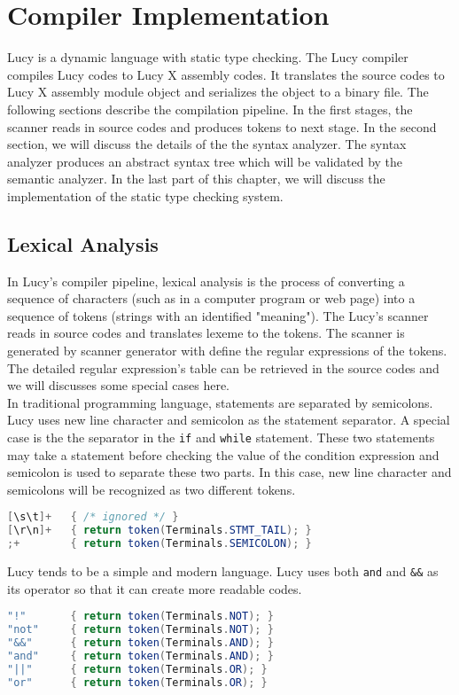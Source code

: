 \chapter{Compiler Implementation}
Lucy is a dynamic language with static type checking. The Lucy compiler compiles Lucy codes to Lucy X assembly codes. It translates the source codes to Lucy X assembly module object and serializes the object to a binary file. The following sections describe the compilation pipeline. In the first stages, the scanner reads in source codes and produces tokens to next stage. In the second section, we will discuss the details of the the syntax analyzer. The syntax analyzer produces an abstract syntax tree which will be validated by the semantic analyzer. In the last part of this chapter, we will discuss the implementation of the static type checking system.


\section{Lexical Analysis}
In Lucy's compiler pipeline, lexical analysis is the process of converting a sequence of characters (such as in a computer program or web page) into a sequence of tokens (strings with an identified "meaning"). The Lucy's scanner reads in source codes and translates lexeme to the tokens. The scanner is generated by scanner generator with define the regular expressions of the tokens. The detailed regular expression's table can be retrieved in the source codes and we will discusses some special cases here. \\
In traditional programming language, statements are separated by semicolons. Lucy uses new line character and semicolon as the statement separator. A special case is the the separator in the \texttt{if} and \texttt{while} statement. These two statements may take a statement before checking the value of the condition expression and semicolon is used to separate these two parts. In this case, new line character and semicolons will be recognized as two different tokens.
\begin{lstlisting}[language=java]
[\s\t]+   { /* ignored */ }
[\r\n]+   { return token(Terminals.STMT_TAIL); }
;+        { return token(Terminals.SEMICOLON); }
\end{lstlisting}
Lucy tends to be a simple and modern language. Lucy uses both \texttt{and} and \texttt{\&\&} as its operator so that it can create more readable codes.
\begin{lstlisting}[language=java]
"!"       { return token(Terminals.NOT); }
"not"     { return token(Terminals.NOT); }
"&&"      { return token(Terminals.AND); }
"and"     { return token(Terminals.AND); }
"||"      { return token(Terminals.OR); }
"or"      { return token(Terminals.OR); }
\end{lstlisting}


